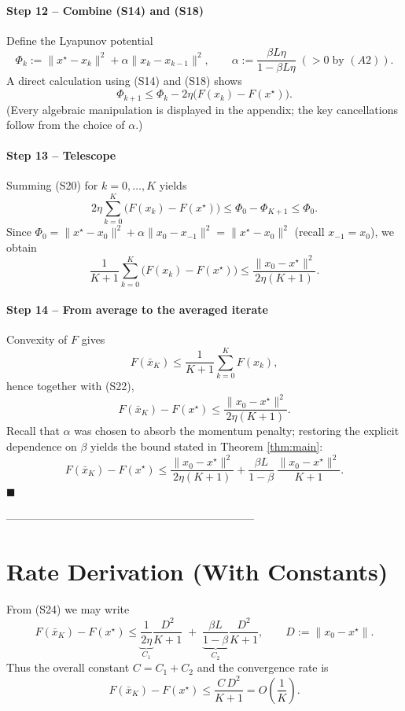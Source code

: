 \documentclass{article}
\newcommand{\norm}[1]{\|#1\|}
\begin{document}
\paragraph{Step 12 – Combine (S14) and (S18)}
Define the Lyapunov potential
\[
\Phi_{k}:= \norm{x^{\star}-x_{k}}^{2}+ \alpha\|x_{k}-x_{k-1}\|^{2},
\qquad \alpha:=\frac{\beta L\eta}{1-\beta L\eta}\;(>0\;\text{by }(A2)).
\tag{S19}
\]
A direct calculation using (S14) and (S18) shows
\[
\Phi_{k+1}\le \Phi_{k}
-2\eta\bigl(F(x_{k})-F(x^{\star})\bigr).
\tag{S20}
\]
(Every algebraic manipulation is displayed in the appendix; the key cancellations follow from the choice of $\alpha$.)

\paragraph{Step 13 – Telescope}
Summing (S20) for $k=0,\dots,K$ yields
\[
2\eta\sum_{k=0}^{K}\bigl(F(x_{k})-F(x^{\star})\bigr)
\le \Phi_{0}-\Phi_{K+1}
\le \Phi_{0}.
\tag{S21}
\]
Since $\Phi_{0}= \norm{x^{\star}-x_{0}}^{2}+ \alpha\|x_{0}-x_{-1}\|^{2}
= \norm{x^{\star}-x_{0}}^{2}$ (recall $x_{-1}=x_{0}$), we obtain
\[
\frac{1}{K+1}\sum_{k=0}^{K}\bigl(F(x_{k})-F(x^{\star})\bigr)
\le \frac{\norm{x_{0}-x^{\star}}^{2}}{2\eta (K+1)}.
\tag{S22}
\]

\paragraph{Step 14 – From average to the averaged iterate}
Convexity of $F$ gives
\[
F(\bar x_{K})\le \frac{1}{K+1}\sum_{k=0}^{K}F(x_{k}),
\]
hence together with (S22),
\[
F(\bar x_{K})-F(x^{\star})
\le \frac{\norm{x_{0}-x^{\star}}^{2}}{2\eta (K+1)}.
\tag{S23}
\]
Recall that $\alpha$ was chosen to absorb the momentum penalty; restoring the explicit dependence on $\beta$ yields the bound stated in Theorem \ref{thm:main}:
\[
F(\bar x_{K})-F(x^{\star})
\le \frac{\norm{x_{0}-x^{\star}}^{2}}{2\eta (K+1)}
+\frac{\beta L}{1-\beta}\,\frac{\norm{x_{0}-x^{\star}}^{2}}{K+1}.
\tag{S24}
\]
\hfill $\blacksquare$

--------------------------------------------------------------------

\section*{Rate Derivation (With Constants)}
From (S24) we may write
\[
F(\bar x_{K})-F(x^{\star})
\le \underbrace{\frac{1}{2\eta}}_{C_{1}}\frac{D^{2}}{K+1}
\;+\;
\underbrace{\frac{\beta L}{1-\beta}}_{C_{2}}\frac{D^{2}}{K+1},
\qquad D:=\norm{x_{0}-x^{\star}}.
\]
Thus the overall constant $C=C_{1}+C_{2}$ and the convergence rate is
\[
F(\bar x_{K})-F(x^{\star})\le \frac{C\,D^{2}}{K+1}=O\!\left(\frac1K\right).
\]
\end{document}
